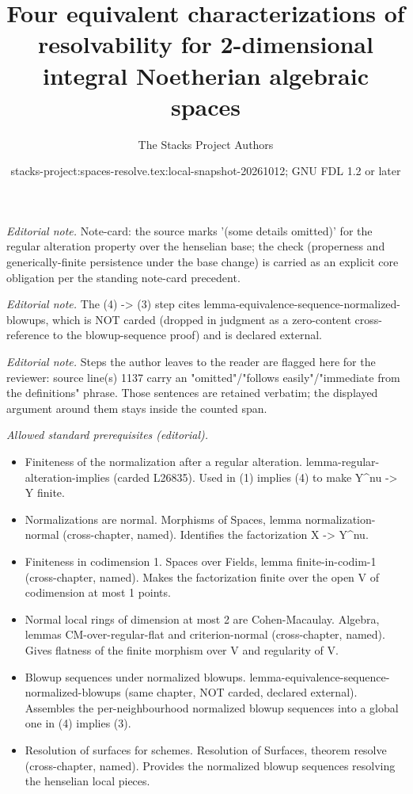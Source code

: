 \documentclass{stacks-project}
\title{Four equivalent characterizations of resolvability for 2-dimensional integral Noetherian algebraic spaces}
\author{The Stacks Project Authors}
\date{stacks-project:spaces-resolve.tex:local-snapshot-20261012; GNU FDL 1.2 or later}
\theoremstyle{plain}
\theoremstyle{definition}
\theoremstyle{remark}
\numberwithin{equation}{subsection}
\begin{document}
\maketitle
\noindent\textit{Editorial note.} Note-card: the source marks '(some details omitted)' for the regular alteration property over the henselian base; the check (properness and generically-finite persistence under the base change) is carried as an explicit core obligation per the standing note-card precedent.\par\medskip
\noindent\textit{Editorial note.} The (4) -> (3) step cites lemma-equivalence-sequence-normalized-blowups, which is NOT carded (dropped in judgment as a zero-content cross-reference to the blowup-sequence proof) and is declared external.\par\medskip
\noindent\textit{Editorial note.} Steps the author leaves to the reader are flagged here for the reviewer: source line(s) 1137 carry an "omitted"/"follows easily"/"immediate from the definitions" phrase. Those sentences are retained verbatim; the displayed argument around them stays inside the counted span.\par\medskip
\noindent\textit{Allowed standard prerequisites (editorial).}\begin{itemize}
\item Finiteness of the normalization after a regular alteration. lemma-regular-alteration-implies (carded L26835). Used in (1) implies (4) to make Y\textasciicircum{}nu -> Y finite.
\item Normalizations are normal. Morphisms of Spaces, lemma normalization-normal (cross-chapter, named). Identifies the factorization X -> Y\textasciicircum{}nu.
\item Finiteness in codimension 1. Spaces over Fields, lemma finite-in-codim-1 (cross-chapter, named). Makes the factorization finite over the open V of codimension at most 1 points.
\item Normal local rings of dimension at most 2 are Cohen-Macaulay. Algebra, lemmas CM-over-regular-flat and criterion-normal (cross-chapter, named). Gives flatness of the finite morphism over V and regularity of V.
\item Blowup sequences under normalized blowups. lemma-equivalence-sequence-normalized-blowups (same chapter, NOT carded, declared external). Assembles the per-neighbourhood normalized blowup sequences into a global one in (4) implies (3).
\item Resolution of surfaces for schemes. Resolution of Surfaces, theorem resolve (cross-chapter, named). Provides the normalized blowup sequences resolving the henselian local pieces.
\end{itemize}\medskip
\end{document}
